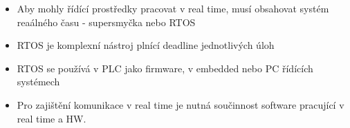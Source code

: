 \begin{itemize}
  \item Aby mohly řídící prostředky pracovat v real time, musí obsahovat systém reaálného času - supersmyčka nebo RTOS
  \item RTOS je komplexní nástroj plnící deadline jednotlivých úloh
  \item RTOS se používá v PLC jako firmware, v embedded nebo PC řídících systémech
  \item Pro zajištění komunikace v real time je nutná součinnost software pracující v real time a HW.
\end{itemize}


